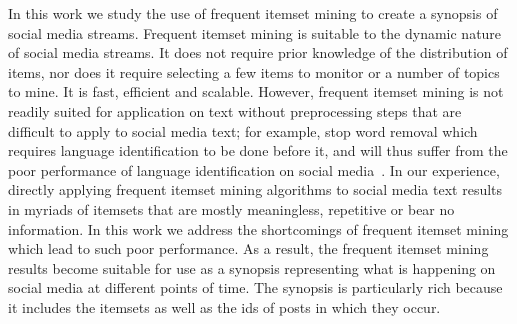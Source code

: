 \documentclass{sig-alternate}
\begin{document}
In this work we study the use of frequent itemset mining
to create a synopsis of social media streams. 
Frequent itemset mining is suitable to the dynamic nature of social media streams.
It does not require prior knowledge of the distribution of items,
nor does it require selecting a few items to monitor 
or a number of topics to mine. %
It is fast, efficient and scalable.
However, frequent itemset mining is not readily suited for application on text
without preprocessing steps that are difficult to apply to social media text;
for example, stop word removal which requires language identification
to be done before it, and will thus suffer from the poor performance
of language identification on social media~\cite{bergsma2012language}.
In our experience, directly applying frequent itemset mining algorithms
to social media text results in myriads of itemsets that are 
mostly meaningless, repetitive or bear no information.
In this work we address the shortcomings of 
frequent itemset mining which lead to such poor performance.
As a result, the frequent itemset mining results become
suitable for use as a synopsis representing what is happening
on social media at different points of time. 
The synopsis is particularly rich because it
includes the itemsets as well as the ids of posts in which they occur.





\end{document}
